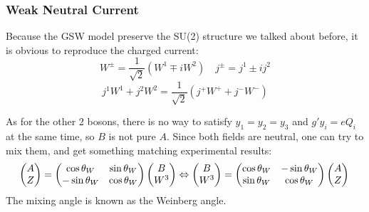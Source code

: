 \subsubsection{Weak Neutral Current}
Because the GSW model preserve the SU(2) structure we talked about before, 
it is obvious to reproduce the charged current:
\begin{equation}
    W^\pm = \frac{1}{\sqrt{2}}(W^1 \mp iW^2)	\quad
    j^\pm = j^1 \pm ij^2
\end{equation}
\begin{equation}
    j^1W^1 + j^2W^2 = \frac{1}{\sqrt{2}}(j^+W^+ + j^-W^-)
\end{equation}

As for the other 2 bosons, there is no way to satisfy $y_1 = y_2 = y_3$ and 
$g'y_i = eQ_i$ at the same time, so $B$ is not pure $A$. 
Since both fields are neutral, one can try to mix them, 
and get something matching experimental results:
\begin{equation}
    \begin{pmatrix}
	A   \\
	Z   \\
    \end{pmatrix}
    =
    \begin{pmatrix}
	\cos\theta_W	& \sin\theta_W	\\
	-\sin\theta_W	& \cos\theta_W	\\
    \end{pmatrix}
    \begin{pmatrix}
	B   \\
	W^3 \\
    \end{pmatrix} 
    \Leftrightarrow
    \begin{pmatrix}
	B   \\
	W^3 \\
    \end{pmatrix}
    =
    \begin{pmatrix}
	\cos\theta_W	& -\sin\theta_W	\\
	\sin\theta_W	& \cos\theta_W	\\
    \end{pmatrix}
    \begin{pmatrix}
	A   \\
	Z	\\
    \end{pmatrix} \\
\end{equation}
The mixing angle is known as the Weinberg angle. 

